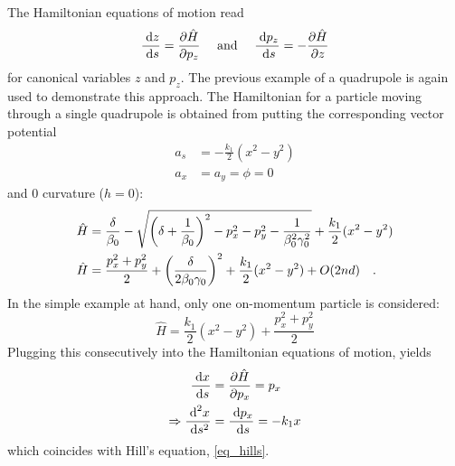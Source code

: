 The Hamiltonian equations of motion \cite{Landau1976} read
\begin{align}
    \frac{\;\text{d} z}{\;\text{d} s}=\frac{\partial \hat{H}}{\partial p_z} \quad\text{ and }\quad
    \frac{\;\text{d} p_z}{\;\text{d} s}=-\frac{\partial \hat{H}}{\partial z}
\end{align}
%
for canonical variables $z$ and $p_z$.
The previous example of a quadrupole is again used to demonstrate this approach.
The Hamiltonian for a particle moving through a single quadrupole is obtained from putting the
corresponding vector potential
%
\begin{align}
  a_s &= -\frac{k_1}{2}(x^2 - y^2) \\
  a_x &= a_y = \phi = 0
\end{align}
%
and 0 curvature ($h = 0$):
%
\begin{align}
    \hat{H} &=\frac{\delta}{\beta_0}
      - \sqrt{\left(\delta + \frac{1}{\beta_0}\right)^2 - p_x^2 - p_y^2 - \frac{1}{\beta_0^2\gamma_0^2}}
      + \frac{k_1}{2}(x^2 - y^2) \\
    \hat{H} &= \frac{p_x^2 + p_y^2}{2} + \left(\frac{\delta}{2\beta_0\gamma_0}\right)^2
    + \frac{k_1}{2}(x^2 - y^2)
    + O(2nd)
    \quad .
    \label{eq_hamil_quad_delta}
\end{align}
%
In the simple example at hand, only one on-momentum particle is considered:
%
\begin{equation}
    \hat{H} = \frac{k_1}{2}\left( x^2 - y^2 \right) + \frac{p_x^2+p_y^2}{2}
    \label{eq_hamil_quad}
\end{equation}
%
Plugging this consecutively into the Hamiltonian equations of motion, yields
\begin{align}
    \frac{\;\text{d} x}{\;\text{d} s} &= \frac{\partial \hat{H}}{\partial p_x} = p_x \\
    \Rightarrow \frac{\;\text{d}^2 x}{\;\text{d} s^2} &= \frac{\;\text{d} p_x}{\;\text{d} s} = -k_1x
\end{align}
which coincides with Hill's equation, \eqref{eq_hills}.

